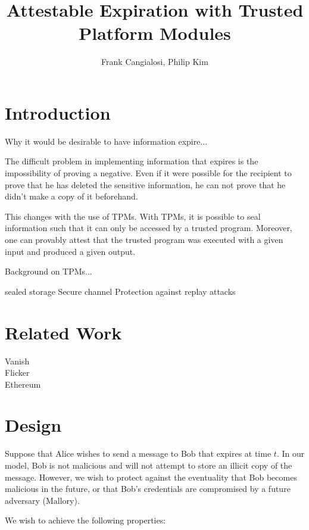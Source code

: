\documentclass{article}
\begin{document}
\title{Attestable Expiration with Trusted Platform Modules}
\author{Frank Cangialosi, Philip Kim}

\maketitle

\section{Introduction}

Why it would be desirable to have information expire...

The difficult problem in implementing information that expires is the impossibility of proving a negative. Even if it were possible for the recipient to prove that he has deleted the sensitive information, he can not prove that he didn't make a copy of it beforehand.

This changes with the use of TPMs. With TPMs, it is possible to seal information such that it can only be accessed by a trusted program. Moreover, one can provably attest that the trusted program was executed with a given input and produced a given output.

Background on TPMs...

sealed storage
Secure channel
Protection against replay attacks


\section{Related Work}

Vanish\\

Flicker\\

Ethereum\\

\section{Design}

Suppose that Alice wishes to send a message to Bob that expires at time $t$. In our model, Bob is not malicious and will not attempt to store an illicit copy of the message. However, we wish to protect against the eventuality that Bob becomes malicious in the future, or that Bob's credentials are compromised by a future adversary (Mallory).

We wish to achieve the following properties:
\end{document}
